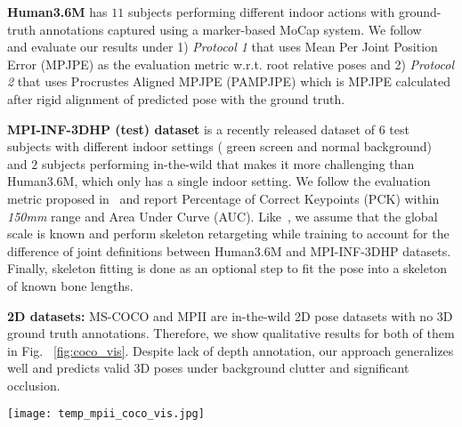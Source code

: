 \documentclass[runningheads]{llncs}
\begin{document}
\indent \textbf{Human3.6M} has $11$ subjects performing different indoor actions with ground-truth annotations captured using a marker-based MoCap system. We follow ~\cite{Tome_2017_CVPR} and evaluate our results under 1) \textit{Protocol 1} that uses Mean Per Joint Position Error (MPJPE) as the evaluation metric w.r.t. root relative poses and 2) \textit{Protocol 2} that uses Procrustes Aligned MPJPE (PAMPJPE) which is MPJPE calculated after rigid alignment of predicted pose with the ground truth.

\textbf{MPI-INF-3DHP (test) dataset} is a recently released dataset of $6$ test subjects with different indoor settings ( green screen and normal background) and $2$ subjects performing in-the-wild that makes it more challenging than Human3.6M, which only has a single indoor setting. We follow the evaluation metric proposed in~\cite{mono-3dhp2017} and report Percentage of Correct Keypoints (PCK) within \textit{150mm} range and Area Under Curve (AUC). Like~\cite{Zhou_2017_ICCV}, we assume that the global scale is known and perform skeleton retargeting while training to account for the difference of joint definitions between Human3.6M and MPI-INF-3DHP datasets. Finally, skeleton fitting is done as an optional step to fit the pose into a skeleton of known bone lengths.

\textbf{2D datasets:} MS-COCO and MPII are in-the-wild 2D pose datasets with no 3D ground truth annotations. Therefore, we show qualitative results for both of them in Fig. ~\ref{fig:coco_vis}. Despite lack of depth annotation, our approach generalizes well and predicts valid 3D poses under background clutter and significant occlusion. 

\begin{figure*}[t]
	\centering
	\texttt{[image: temp\_mpii\_coco\_vis.jpg]}
    \caption{(a) Comparison of our temporal model TP-Net with SAP-Net on a video. The highlighted poses demonstrate the ability of TP-Net to learn temporal correlations, and smoothen and refine pose estimates from SAP-Net. (b) Qualitative results of SAP-Net on some images from MPII and MS-COCO datasets, from multiple viewpoints.}
    \label{fig:coco_vis}
    \vspace{-2em}
\end{figure*}
\vspace{-1em}
\end{document}
